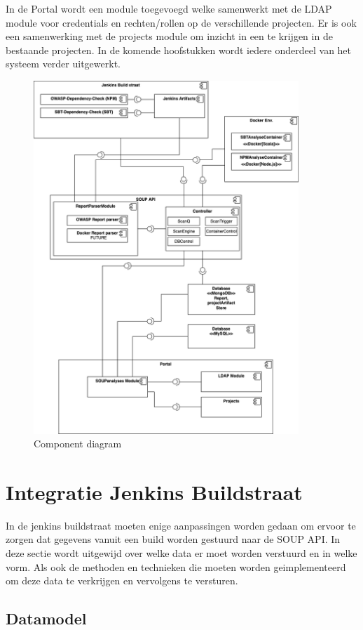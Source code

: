 In de Portal wordt een module toegevoegd welke samenwerkt met de LDAP module voor credentials en rechten/rollen op de verschillende projecten. Er is ook een samenwerking met de projects module om inzicht in een te krijgen in de bestaande projecten. In de komende hoofstukken wordt iedere onderdeel van het systeem verder uitgewerkt.
\begin{figure}
    \myfloatalign
    \includegraphics[width=10cm]{gfx/UMLcomponentDiagram}
    \caption{Component diagram}
    \label{fig:UML-ComponentDiagram}
\end{figure}

\section{Integratie Jenkins Buildstraat}\label{sec:integratie-jenkins-buildstraat}
In de jenkins buildstraat moeten enige aanpassingen worden gedaan om ervoor te zorgen dat gegevens vanuit een build worden gestuurd naar de SOUP API. In deze sectie wordt uitgewijd over welke data er moet worden verstuurd en in welke vorm. Als ook de methoden en technieken die moeten worden geimplementeerd om deze data te verkrijgen en vervolgens te versturen.

\subsection{Datamodel}\label{subsec:datamodel}

